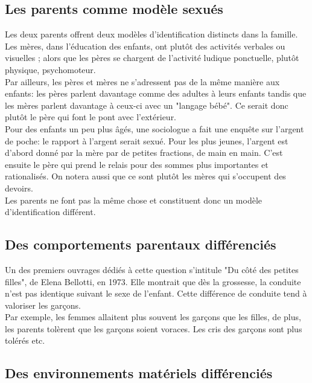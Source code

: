 \documentclass[12pt, a4paper, openany]{book}
\begin{document}
\subsection{Les parents comme modèle sexués}

Les deux parents offrent deux modèles d'identification distincts dans la famille. Les mères, dans l'éducation des enfants, ont plutôt des activités verbales ou visuelles ; alors que les pères se chargent de l'activité ludique ponctuelle, plutôt physique, psychomoteur. \\
Par ailleurs, les pères et mères ne s'adressent pas de la même manière aux enfants: les pères parlent davantage comme des adultes à leurs enfants tandis que les mères parlent davantage à ceux-ci avec un "langage bébé". Ce serait donc plutôt le père qui font le pont avec l'extérieur. \\
Pour des enfants un peu plus âgés, une sociologue a fait une enquête sur l'argent de poche: le rapport à l'argent serait sexué. Pour les plus jeunes, l'argent est d'abord donné par la mère par de petites fractions, de main en main. C'est ensuite le père qui prend le relais pour des sommes plus importantes et rationalisés. On notera aussi que ce sont plutôt les mères qui s'occupent des devoirs. \\
Les parents ne font pas la même chose et constituent donc un modèle d'identification différent. 

\subsection{Des comportements parentaux différenciés}

Un des premiers ouvrages dédiés à cette question s'intitule "Du côté des petites filles", de Elena Bellotti, en 1973. Elle montrait que dès la grossesse, la conduite n'est pas identique suivant le sexe de l'enfant. Cette différence de conduite tend à valoriser les garçons. \\
Par exemple, les femmes allaitent plus souvent les garçons que les filles, de plus, les parents tolèrent que les garçons soient voraces. Les cris des garçons sont plus tolérés etc. \\

\subsection{Des environnements matériels différenciés}
\end{document}
